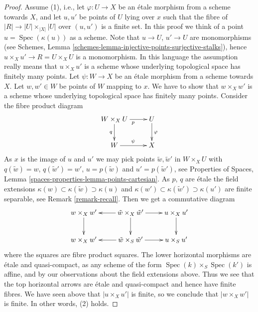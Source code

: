 \documentclass{stacks-project}
\theoremstyle{plain}
\theoremstyle{definition}
\theoremstyle{remark}
\numberwithin{equation}{subsection}
\def\Spec{\mathop{\mathrm{Spec}}}
\begin{document}
\begin{proof}
Assume (1), i.e., let $\varphi : U \to X$ be an \'etale morphism from a scheme
towards $X$, and let $u, u'$ be points of $U$ lying over $x$
such that the fibre of $|R| \to |U| \times_{|X|} |U|$ over $(u, u')$
is a finite set. In this proof we think of a point $u = \Spec(\kappa(u))$
as a scheme. Note that $u \to U$, $u' \to U$ are monomorphisms (see
Schemes, Lemma \ref{schemes-lemma-injective-points-surjective-stalks}),
hence $u \times_X u' \to R = U \times_X U$ is a monomorphism.
In this language the assumption really means that
$u \times_X u'$ is a scheme whose underlying topological space has
finitely many points.
Let $\psi : W \to X$ be an \'etale morphism from a scheme towards $X$.
Let $w, w' \in W$ be points of $W$ mapping to $x$.
We have to show that $w \times_X w'$ is a scheme whose underlying topological
space has finitely many points.
Consider the fibre product diagram
$$
\xymatrix{
W \times_X U \ar[r]_p \ar[d]_q & U \ar[d]^\varphi \\
W \ar[r]^\psi & X
}
$$
As $x$ is the image of $u$ and $u'$ we may pick points
$\tilde w, \tilde w'$ in $W \times_X U$ with $q(\tilde w) = w$,
$q(\tilde w') = w'$, $u = p(\tilde w)$ and $u' = p(\tilde w')$, see
Properties of Spaces,
Lemma \ref{spaces-properties-lemma-points-cartesian}.
As $p$, $q$ are \'etale the field extensions
$\kappa(w) \subset \kappa(\tilde w) \supset \kappa(u)$ and
$\kappa(w') \subset \kappa(\tilde w') \supset \kappa(u')$ are
finite separable, see Remark \ref{remark-recall}.
Then we get a commutative diagram
$$
\xymatrix{
w \times_X w' \ar[d] &
\tilde w \times_X \tilde w' \ar[l] \ar[d] \ar[r] &
u \times_X u' \ar[d] \\
w \times_X w' &
\tilde w \times_S \tilde w' \ar[l] \ar[r] &
u \times_S u'
}
$$
where the squares are fibre product squares. The lower horizontal
morphisms are \'etale and quasi-compact, as any scheme of the form
$\Spec(k) \times_S \Spec(k')$ is affine, and by our
observations about the field extensions above.
Thus we see that the top horizontal arrows are \'etale and quasi-compact
and hence have finite fibres.
We have seen above that $|u \times_X u'|$ is finite, so we conclude that
$|w \times_X w'|$ is finite. In other words, (2) holds.


\end{proof}
\end{document}
